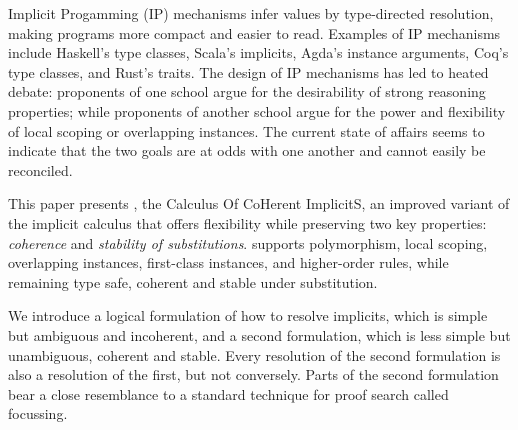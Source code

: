 Implicit Progamming (IP) mechanisms infer values by type-directed
resolution, making programs more compact and easier to read.
Examples of IP mechanisms include Haskell's type classes, Scala's
implicits, Agda's instance arguments, Coq's type classes, and Rust's
traits.  The design of IP mechanisms has led to heated debate:
proponents of one school argue for the desirability of strong
reasoning properties; while proponents of another
school argue for the power and flexibility of local scoping or
overlapping instances.  The current state of affairs seems to indicate that
the two goals are at odds with one another and cannot easily be
reconciled.

This paper presents \name, the Calculus Of CoHerent ImplicitS,
an improved variant of the implicit calculus that offers flexibility
while preserving two key properties: \emph{coherence} and
\emph{stability of substitutions}. \name supports
polymorphism, local scoping,
overlapping instances, first-class instances, and higher-order
rules, while remaining type safe, coherent and stable under substitution.

We introduce a logical formulation of how to resolve implicits, which
is simple but ambiguous and incoherent, and a second formulation,
which is less simple but unambiguous, coherent and stable.  Every resolution
of the second formulation is also a resolution of the first, but not
conversely.  Parts of the second formulation bear a close resemblance
to a standard technique for proof search called focussing.





